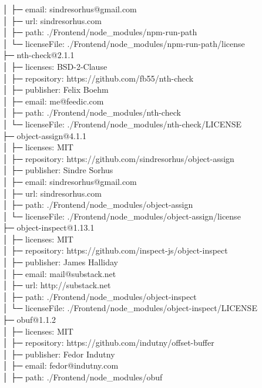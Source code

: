 │  ├─ email: sindresorhus@gmail.com\\
│  ├─ url: sindresorhus.com\\
│  ├─ path: ./Frontend/node\_modules/npm-run-path\\
│  └─ licenseFile: ./Frontend/node\_modules/npm-run-path/license\\
├─ nth-check@2.1.1\\
│  ├─ licenses: BSD-2-Clause\\
│  ├─ repository: https://github.com/fb55/nth-check\\
│  ├─ publisher: Felix Boehm\\
│  ├─ email: me@feedic.com\\
│  ├─ path: ./Frontend/node\_modules/nth-check\\
│  └─ licenseFile: ./Frontend/node\_modules/nth-check/LICENSE\\
├─ object-assign@4.1.1\\
│  ├─ licenses: MIT\\
│  ├─ repository: https://github.com/sindresorhus/object-assign\\
│  ├─ publisher: Sindre Sorhus\\
│  ├─ email: sindresorhus@gmail.com\\
│  ├─ url: sindresorhus.com\\
│  ├─ path: ./Frontend/node\_modules/object-assign\\
│  └─ licenseFile: ./Frontend/node\_modules/object-assign/license\\
├─ object-inspect@1.13.1\\
│  ├─ licenses: MIT\\
│  ├─ repository: https://github.com/inspect-js/object-inspect\\
│  ├─ publisher: James Halliday\\
│  ├─ email: mail@substack.net\\
│  ├─ url: http://substack.net\\
│  ├─ path: ./Frontend/node\_modules/object-inspect\\
│  └─ licenseFile: ./Frontend/node\_modules/object-inspect/LICENSE\\
├─ obuf@1.1.2\\
│  ├─ licenses: MIT\\
│  ├─ repository: https://github.com/indutny/offset-buffer\\
│  ├─ publisher: Fedor Indutny\\
│  ├─ email: fedor@indutny.com\\
│  ├─ path: ./Frontend/node\_modules/obuf\\
